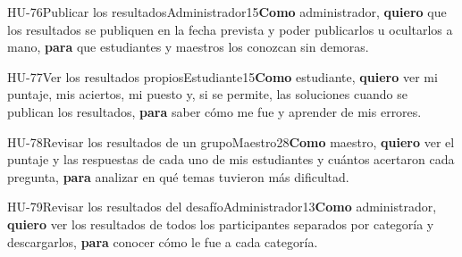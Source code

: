 \begin{historia}[1]{HU-76}{Publicar los resultados}{Administrador}{1}{5}{\textbf{Como} administrador, \textbf{quiero} que los resultados se publiquen en la fecha prevista y poder publicarlos u ocultarlos a mano, \textbf{para} que estudiantes y maestros los conozcan sin demoras.}
\end{historia}

\begin{historia}[1]{HU-77}{Ver los resultados propios}{Estudiante}{1}{5}{\textbf{Como} estudiante, \textbf{quiero} ver mi puntaje, mis aciertos, mi puesto y, si se permite, las soluciones cuando se publican los resultados, \textbf{para} saber cómo me fue y aprender de mis errores.}
\end{historia}

\begin{historia}[1]{HU-78}{Revisar los resultados de un grupo}{Maestro}{2}{8}{\textbf{Como} maestro, \textbf{quiero} ver el puntaje y las respuestas de cada uno de mis estudiantes y cuántos acertaron cada pregunta, \textbf{para} analizar en qué temas tuvieron más dificultad.}
\end{historia}

\begin{historia}[1]{HU-79}{Revisar los resultados del desafío}{Administrador}{1}{3}{\textbf{Como} administrador, \textbf{quiero} ver los resultados de todos los participantes separados por categoría y descargarlos, \textbf{para} conocer cómo le fue a cada categoría.}
\end{historia}

